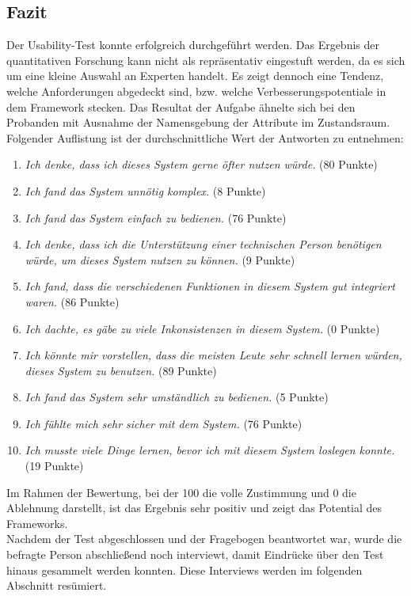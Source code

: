     \subsection{Fazit}
    \label{subsec:usabilityFazit}
        Der Usability-Test konnte erfolgreich durchgeführt werden.
        Das Ergebnis der quantitativen Forschung kann nicht als repräsentativ eingestuft werden, da es sich um eine kleine Auswahl an Experten handelt. Es zeigt dennoch eine Tendenz, 
        welche Anforderungen abgedeckt sind, bzw. welche Verbesserungspotentiale in dem Framework stecken.  
        Das Resultat der Aufgabe ähnelte sich bei den Probanden mit Ausnahme der Namensgebung der Attribute im Zustandsraum. 
        \\
        Folgender Auflistung ist der durchschnittliche Wert der Antworten zu entnehmen:
        \begin{enumerate}
            \item \textit{Ich denke, dass ich dieses System gerne öfter nutzen würde.} (80 Punkte)
            \item \textit{Ich fand das System unnötig komplex.} (8 Punkte)
            \item \textit{Ich fand das System einfach zu bedienen.} (76 Punkte)
            \item \textit{Ich denke, dass ich die Unterstützung einer technischen Person benötigen würde, um dieses System nutzen zu können.} (9 Punkte)
            \item \textit{Ich fand, dass die verschiedenen Funktionen in diesem System gut integriert waren.} (86 Punkte)
            \item \textit{Ich dachte, es gäbe zu viele Inkonsistenzen in diesem System.} (0 Punkte)
            \item \textit{Ich könnte mir vorstellen, dass die meisten Leute sehr schnell lernen würden, dieses System zu benutzen.} (89 Punkte)
            \item \textit{Ich fand das System sehr umständlich zu bedienen.} (5 Punkte)
            \item \textit{Ich fühlte mich sehr sicher mit dem System.} (76 Punkte)
            \item \textit{Ich musste viele Dinge lernen, bevor ich mit diesem System loslegen konnte.} (19 Punkte)
        \end{enumerate}
        Im Rahmen der Bewertung, bei der 100 die volle Zustimmung und 0 die Ablehnung darstellt, ist das Ergebnis 
        sehr positiv und zeigt das Potential des Frameworks. 
        \\
        Nachdem der Test abgeschlossen und der Fragebogen beantwortet war, wurde die befragte Person abschließend noch interviewt, damit 
        Eindrücke über den Test hinaus gesammelt werden konnten. Diese Interviews werden im folgenden Abschnitt resümiert. 

